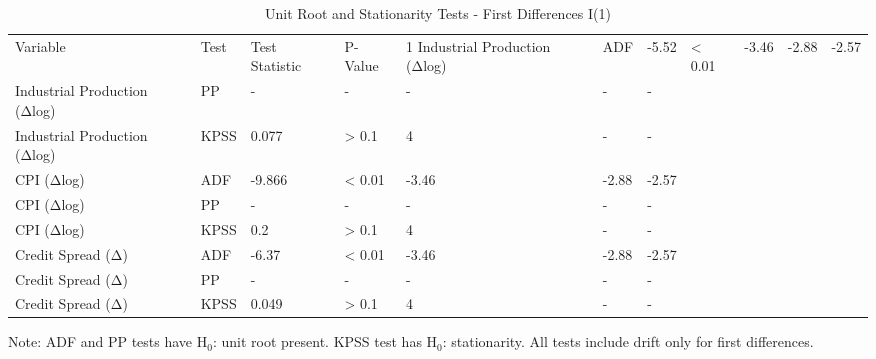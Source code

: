 \begin{table}[htbp]
\centering
\caption{Unit Root and Stationarity Tests - First Differences I(1)}
\label{tab:unit_root_diff}
\begin{tabular}{lllllll}
  \toprule
Variable & Test & Test Statistic & P-Value & 1%
  \midrule
Industrial Production (Δlog) & ADF & -5.52 & < 0.01 & -3.46 & -2.88 & -2.57 \\ 
  Industrial Production (Δlog) & PP & - & - & - & - & - \\ 
  Industrial Production (Δlog) & KPSS & 0.077 & > 0.1 & 4 & - & - \\ 
  CPI (Δlog) & ADF & -9.866 & < 0.01 & -3.46 & -2.88 & -2.57 \\ 
  CPI (Δlog) & PP & - & - & - & - & - \\ 
  CPI (Δlog) & KPSS & 0.2 & > 0.1 & 4 & - & - \\ 
  Credit Spread (Δ) & ADF & -6.37 & < 0.01 & -3.46 & -2.88 & -2.57 \\ 
  Credit Spread (Δ) & PP & - & - & - & - & - \\ 
  Credit Spread (Δ) & KPSS & 0.049 & > 0.1 & 4 & - & - \\ 
   \bottomrule
\end{tabular}
\begin{tablenotes}
\small
\item Note: ADF and PP tests have H$_0$: unit root present. KPSS test has H$_0$: stationarity. All tests include drift only for first differences.
\end{tablenotes}
\end{table}
